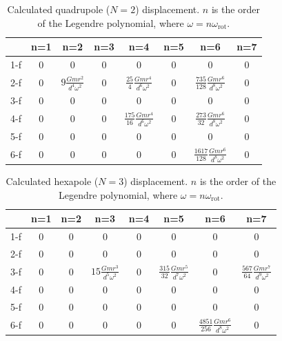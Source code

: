 \documentclass[%
 reprint,
superscriptaddress,
 amsmath,amssymb,
 aps,
]{revtex4-1}
\begin{document}
\begin{table}
\begin{center}
\caption{Calculated quadrupole ($N=2$) displacement. $n$ is the order of the Legendre polynomial, where $\omega=n\omega_{\mathrm{rot}}$. \label{tab:N2}}
\footnotesize
\begin{tabular}{cccccccc}
\hline
& n=1 & n=2& n=3 &n=4&n=5&n=6&n=7 \\
\hline
1-f&0&0&0&0&0&0&0 \\
2-f&0&$9 \frac{Gmr^2}{d^4\omega^2}$&0&$\frac{25}{4} \frac{Gmr^4}{d^6\omega^2}$&0&$\frac{735}{128} \frac{Gmr^6}{d^8\omega^2}$&0  \\
3-f&0&0&0&0&0&0&0\\
4-f&0&0&0&$\frac{175}{16} \frac{Gmr^4}{d^6\omega^2}$&0& $\frac{273}{32} \frac{Gmr^6}{d^8\omega^2}$&0 \\
5-f&0&0&0&0&0&0&0 \\
6-f&0&0&0&0&0&$\frac{1617}{128} \frac{Gmr^6}{d^8\omega^2}$&0  \\
\hline
\end{tabular}
\end{center}
\end{table}

\begin{table}
\begin{center}
\caption{Calculated hexapole ($N=3$) displacement. $n$ is the order of the Legendre polynomial, where $\omega=n\omega_{\mathrm{rot}}$.  \label{tab:N3}}
\footnotesize
\begin{tabular}{cccccccc}
\hline
& n=1 & n=2& n=3 &n=4&n=5&n=6&n=7 \\
\hline
1-f&0&0&0&0&0&0&0 \\
2-f&0&0&0&0&0&0&0  \\
3-f&0&0&$15\frac{Gmr^3}{d^5\omega^2}$&0&$\frac{315}{32}\frac{Gmr^5}{d^7\omega^2}$&0& $\frac{567}{64} \frac{Gmr^7}{d^9 \omega^2}$\\
4-f&0&0&0&0&0&0&0 \\
5-f&0&0&0&0&0&0&0 \\
6-f&0&0&0&0&0&$\frac{4851}{256} \frac{Gmr^6}{d^8\omega^2}$&0  \\
\hline
\end{tabular}
\end{center}
\end{table}
\end{document}
